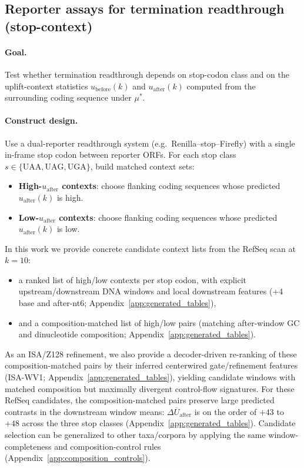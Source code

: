 \subsection{Reporter assays for termination readthrough (stop-context)}
\label{app:bio_validation_readthrough}

\paragraph{Goal.}
Test whether termination readthrough depends on stop-codon class and on the uplift-context statistics $u_{\mathrm{before}}(k)$ and $u_{\mathrm{after}}(k)$ computed from the surrounding coding sequence under $\mu^\ast$.

\paragraph{Construct design.}
Use a dual-reporter readthrough system (e.g.\ Renilla--stop--Firefly) with a single in-frame stop codon between reporter ORFs.
For each stop class $s\in\{\mathrm{UAA,UAG,UGA}\}$, build matched context sets:
\begin{itemize}
\item \textbf{High-$u_{\mathrm{after}}$ contexts}: choose flanking coding sequences whose predicted $u_{\mathrm{after}}(k)$ is high.
\item \textbf{Low-$u_{\mathrm{after}}$ contexts}: choose flanking coding sequences whose predicted $u_{\mathrm{after}}(k)$ is low.
\end{itemize}
In this work we provide concrete candidate context lists from the RefSeq scan at $k=10$:
\begin{itemize}
\item a ranked list of high/low contexts per stop codon, with explicit upstream/downstream DNA windows and local downstream features (+4 base and after-nt6; Appendix~\ref{app:generated_tables}),
\item and a composition-matched list of high/low pairs (matching after-window GC and dinucleotide composition; Appendix~\ref{app:generated_tables}).
\end{itemize}
As an ISA/Z128 refinement, we also provide a decoder-driven re-ranking of these composition-matched pairs by their inferred centerwired gate/refinement features (ISA-WV1; Appendix~\ref{app:generated_tables}), yielding candidate windows with matched composition but maximally divergent control-flow signatures.
For these RefSeq candidates, the composition-matched pairs preserve large predicted contrasts in the downstream window means:
$\Delta\overline{U}_{\mathrm{after}}$ is on the order of $+43$ to $+48$ across the three stop classes (Appendix~\ref{app:generated_tables}).
Candidate selection can be generalized to other taxa/corpora by applying the same window-completeness and composition-control rules (Appendix~\ref{app:composition_controls}).


